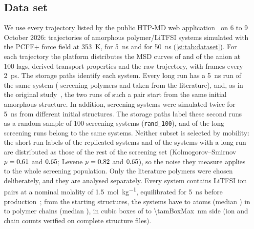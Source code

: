 \documentclass[journal=jcisd8,manuscript=article,email=true]{achemso}
\begin{document}
\subsection{Data set}\label{sec:data}
We use every trajectory listed by the public HTP-MD web application~\cite{Xie2023HTPMD} on
6 to 9 October 2026: \nTotal{} trajectories of amorphous polymer/LiTFSI systems simulated with the PCFF+ force
field at \SI{353}{\kelvin}, \nShort{} for \SI{5}{\nano\second} and \nLong{} for
\SI{50}{\nano\second} (\cref{si:tab:dataset}). For each trajectory the platform distributes the
MSD curves of \Li{} and of the anion at 100 lags, derived transport properties and the raw
trajectory, with frames every \SI{2}{\pico\second}. The storage paths identify each system. Every
long run has a \SI{5}{\nano\second} run of the same system (\nLongScreen{} screening polymers and
\nLongLit{} taken from the literature), and, as in the original study~\cite{Xie2022Accelerating},
the two runs of such a pair start from the same initial amorphous structure. In addition, \nRep{}
screening systems were simulated twice for \SI{5}{\nano\second} from different initial
structures. The storage paths label these second runs as a random sample of 100 screening
systems (\texttt{rand\_100}), and \techoEndReprOverlap{} of the \nLongScreen{} long screening runs
belong to the same systems. Neither subset is selected by mobility: the short-run labels of the
replicated systems and of the systems with a long run are distributed as those of the rest of the
screening set (Kolmogorov--Smirnov $p=0.61$ and $0.65$; Levene
$p=0.82$ and $0.65$), so the noise they measure applies to the
whole screening population. Only the \nLongLit{} literature polymers were chosen deliberately, and
they are analysed separately. Every system contains \tamNIons{} LiTFSI ion pairs at a nominal molality of
\SI{1.5}{\mole\per\kilo\gram}, equilibrated for \SI{5}{\nano\second} before
production~\cite{Xie2022Accelerating}; from the starting structures, the systems have
\tamNAtomsMin{} to \tamNAtomsMax{} atoms (median \tamNAtomsMed) in \tamChainsMin{} to
\tamChainsMax{} polymer chains (median \tamChainsMed), in cubic boxes of \tamBoxMin{} to
\SI{\tamBoxMax}{\nano\metre} side (ion and chain counts verified on \tamNRecount{} complete
structure files).
\end{document}
